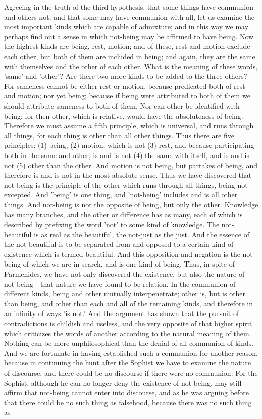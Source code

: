 \documentclass[11pt,letter]{article}
\begin{document}
\par  Agreeing in the truth of the third hypothesis, that some things have communion and others not, and that some may have communion with all, let us examine the most important kinds which are capable of admixture; and in this way we may perhaps find out a sense in which not-being may be affirmed to have being. Now the highest kinds are being, rest, motion; and of these, rest and motion exclude each other, but both of them are included in being; and again, they are the same with themselves and the other of each other. What is the meaning of these words, 'same' and 'other'? Are there two more kinds to be added to the three others? For sameness cannot be either rest or motion, because predicated both of rest and motion; nor yet being; because if being were attributed to both of them we should attribute sameness to both of them. Nor can other be identified with being; for then other, which is relative, would have the absoluteness of being. Therefore we must assume a fifth principle, which is universal, and runs through all things, for each thing is other than all other things. Thus there are five principles: (1) being, (2) motion, which is not (3) rest, and because participating both in the same and other, is and is not (4) the same with itself, and is and is not (5) other than the other. And motion is not being, but partakes of being, and therefore is and is not in the most absolute sense. Thus we have discovered that not-being is the principle of the other which runs through all things, being not excepted. And 'being' is one thing, and 'not-being' includes and is all other things. And not-being is not the opposite of being, but only the other. Knowledge has many branches, and the other or difference has as many, each of which is described by prefixing the word 'not' to some kind of knowledge. The not-beautiful is as real as the beautiful, the not-just as the just. And the essence of the not-beautiful is to be separated from and opposed to a certain kind of existence which is termed beautiful. And this opposition and negation is the not-being of which we are in search, and is one kind of being. Thus, in spite of Parmenides, we have not only discovered the existence, but also the nature of not-being—that nature we have found to be relation. In the communion of different kinds, being and other mutually interpenetrate; other is, but is other than being, and other than each and all of the remaining kinds, and therefore in an infinity of ways 'is not.' And the argument has shown that the pursuit of contradictions is childish and useless, and the very opposite of that higher spirit which criticizes the words of another according to the natural meaning of them. Nothing can be more unphilosophical than the denial of all communion of kinds. And we are fortunate in having established such a communion for another reason, because in continuing the hunt after the Sophist we have to examine the nature of discourse, and there could be no discourse if there were no communion. For the Sophist, although he can no longer deny the existence of not-being, may still affirm that not-being cannot enter into discourse, and as he was arguing before that there could be no such thing as falsehood, because there was no such thing as 
\end{document}
